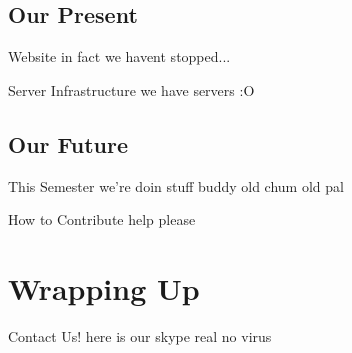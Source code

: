 \documentclass{beamer}
\begin{document}
  \subsection{Our Present}
  \begin{frame}{Website}
    in fact we havent stopped...
  \end{frame}

  \begin{frame}{Server Infrastructure}
    we have servers :O
  \end{frame}

  \subsection{Our Future}
  \begin{frame}{This Semester}
    we're doin stuff buddy old chum old pal
  \end{frame}

  \begin{frame}{How to Contribute}
    help please
  \end{frame}

  \section{Wrapping Up}
  \begin{frame}{Contact Us!}
    here is our skype real no virus
  \end{frame}
\end{document}
